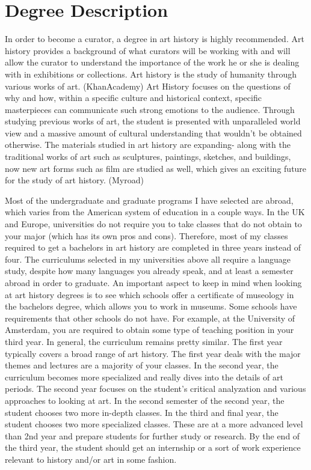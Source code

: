 \section{Degree Description}
	In order to become a curator, a degree in art history is highly recommended. Art history provides a background of what curators will be working with and will allow the curator to understand the importance of the work he or she is dealing with in exhibitions or collections. Art history is the study of humanity through various works of art. (KhanAcademy) Art History focuses on the questions of why and how, within a specific culture and historical context, specific masterpieces can communicate such strong emotions to the audience. Through studying previous works of art, the student is presented with unparalleled world view and a massive amount of cultural understanding that wouldn’t be obtained otherwise. The materials studied in art history are expanding- along with the traditional works of art such as sculptures, paintings, sketches, and buildings, now new art forms such as film are studied as well, which gives an exciting future for the study of art history. (Myroad) 

	Most of the undergraduate and graduate programs I have selected are abroad, which varies from the American system of education in a couple ways. In the UK and Europe, universities do not require you to take classes that do not obtain to your major (which has its own pros and cons). Therefore, most of my classes required to get a bachelors in art history are completed in three years instead of four. The curriculums selected in my universities above all require a language study, despite how many languages you already speak, and at least a semester abroad in order to graduate. An important aspect to keep in mind when looking at art history degrees is to see which schools offer a certificate of museology in the bachelors degree, which allows you to work in museums. Some schools have requirements that other schools do not have. For example, at the University of Amsterdam, you are required to obtain some type of teaching position in your third year. In general, the curriculum remains pretty similar. The first year typically covers a broad range of art history. The first year deals with the major themes and lectures are a majority of your classes. In the second year, the curriculum becomes more specialized and really dives into the details of art periods. The second year focuses on the student’s critical analyzation and various approaches to looking at art. In the second semester of the second year, the student chooses two more in-depth classes. In the third and final year, the student chooses two more specialized classes. These are at a more advanced level than 2nd year and prepare students for further study or research. By the end of the third year, the student should get an internship or a sort of work experience relevant to history and/or art in some fashion. 

